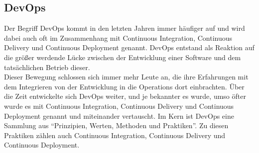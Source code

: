 \subsection{DevOps}\label{devops}
Der Begriff DevOps kommt in den letzten Jahren immer häufiger auf\autocite[Vgl.][]{Sauce.2018} und wird dabei auch oft im Zusammenhang mit Continuous Integration, Continuous Delivery und Continuous Deployment genannt. DevOps entstand als Reaktion auf die größer werdende Lücke zwischen der Entwicklung einer Software und dem tatsächlichen Betrieb dieser.\autocite[Vgl.][S.22]{Stahl.2018}\\ Dieser Bewegung schlossen sich immer mehr Leute an, die ihre Erfahrungen mit dem Integrieren von der Entwicklung in die Operations dort einbrachten. Über die Zeit entwickelte sich DevOps weiter, und je bekannter es wurde, umso öfter wurde es mit Continuous Integration, Continuous Delivery und Continuous Deployment genannt und miteinander vertauscht.\autocite[Vgl.][S.23]{Stahl.2018} Im Kern ist DevOps eine Sammlung aus \enquote{Prinzipien, Werten, Methoden und Praktiken}\autocite[S.23]{Stahl.2018}. Zu diesen Praktiken zählen auch Continuous Integration, Continuous Delivery und Continuous Deployment. 
